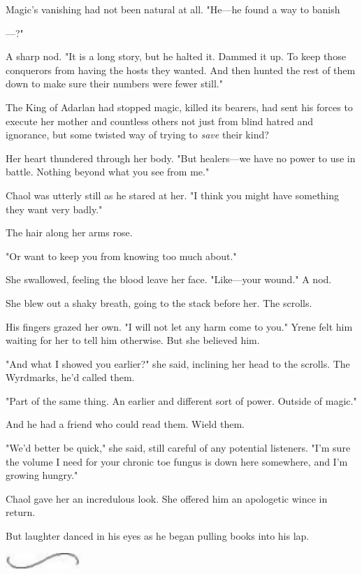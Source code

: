 Magic's vanishing had not been natural at all. "He---he found a way to banish

---?"

A sharp nod. "It is a long story, but he halted it. Dammed it up. To keep those conquerors from having the hosts they wanted. And then hunted the rest of them down to make sure their numbers were fewer still."

The King of Adarlan had stopped magic, killed its bearers, had sent his forces to execute her mother and countless others  not just from blind hatred and ignorance, but some twisted way of trying to
\emph{save} their kind?

Her heart thundered through her body. "But healers---we have no power to use in battle. Nothing beyond what you see from me."

Chaol was utterly still as he stared at her. "I think you might have something they want very badly."

The hair along her arms rose.

"Or want to keep you from knowing too much about."

She swallowed, feeling the blood leave her face. "Like---your wound." A nod.

She blew out a shaky breath, going to the stack before her. The scrolls.

His fingers grazed her own. "I will not let any harm come to you." Yrene felt him waiting for her to tell him otherwise. But she believed him.

"And what I showed you earlier?" she said, inclining her head to the scrolls. The Wyrdmarks, he'd called them.

"Part of the same thing. An earlier and different sort of power. Outside of magic."

And he had a friend who could read them. Wield them.

"We'd better be quick," she said, still careful of any potential listeners. "I'm sure the volume I need for your chronic toe fungus is down here somewhere, and I'm growing hungry."

Chaol gave her an incredulous look. She offered him an apologetic wince in return.

But laughter danced in his eyes as he began pulling books into his lap.

\includegraphics[width=1.12in,height=0.24in]{images/seperator}

